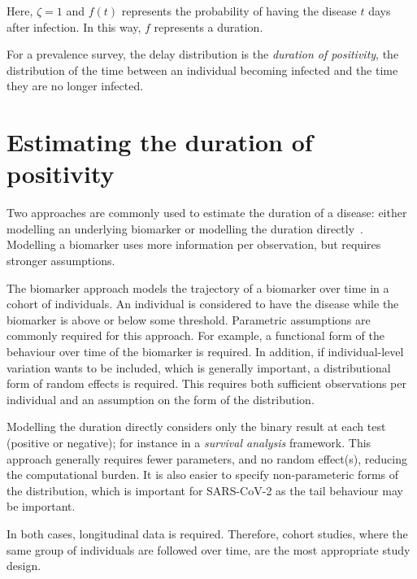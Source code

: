 \documentclass[thesis.tex]{subfiles}
\begin{document}
Here, $\zeta = 1$ and $f(t)$ represents the probability of having the disease $t$ days after infection.
In this way, $f$ represents a duration.

For a prevalence survey, the delay distribution is the \emph{duration of positivity}, the distribution of the time between an individual becoming infected and the time they are no longer infected.

\section{Estimating the duration of positivity}

Two approaches are commonly used to estimate the duration of a disease: either modelling an underlying biomarker or modelling the duration directly~\autocite[e.g.][]{sweetingEstimating}.
Modelling a biomarker uses more information per observation, but requires stronger assumptions.

The biomarker approach models the trajectory of a biomarker over time in a cohort of individuals.
An individual is considered to have the disease while the biomarker is above or below some threshold.
Parametric assumptions are commonly required for this approach.
For example, a functional form of the behaviour over time of the biomarker is required.
In addition, if individual-level variation wants to be included, which is generally important, a distributional form of random effects is required.
This requires both sufficient observations per individual and an assumption on the form of the distribution.

Modelling the duration directly considers only the binary result at each test (positive or negative); for instance in a \emph{survival analysis} framework.
This approach generally requires fewer parameters, and no random effect(s), reducing the computational burden.
It is also easier to specify non-parameteric forms of the distribution, which is important for SARS-CoV-2 as the tail behaviour may be important.

In both cases, longitudinal data is required.
Therefore, cohort studies, where the same group of individuals are followed over time, are the most appropriate study design.
\end{document}
